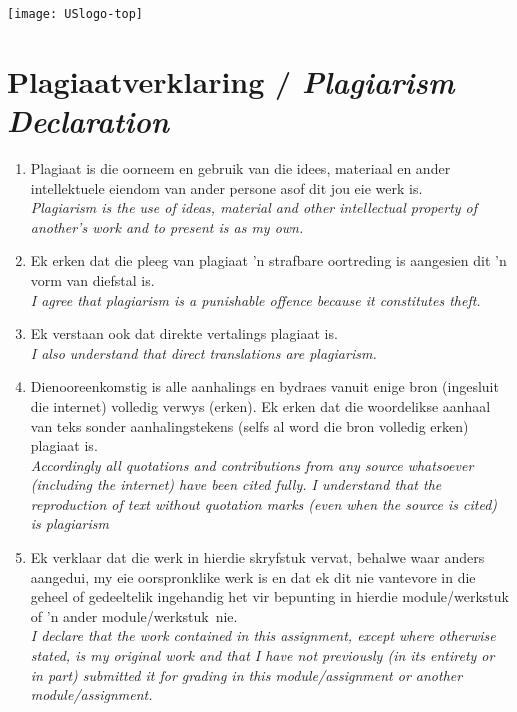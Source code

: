 \newpage
\thispagestyle{plain}
\makeatletter{}\makeatother

\centerline{\texttt{[image: USlogo-top]}}
\vspace*{-10pt}

\section*{\centering Plagiaatverklaring / \textit{Plagiarism Declaration}}

\vspace*{5pt}

\begin{enumerate}
    \item Plagiaat is die oorneem en gebruik van die idees, materiaal en ander intellektuele eiendom van ander persone asof dit jou eie werk is.\\
    \textit{Plagiarism is the use of ideas, material and other intellectual property of another's work
        and to present is as my own.}
    
    \item Ek erken dat die pleeg van plagiaat 'n strafbare oortreding is aangesien dit 'n vorm van diefstal is.\\
    \textit{I agree that plagiarism is a punishable offence because it constitutes theft.}
    
    \item Ek verstaan ook dat direkte vertalings plagiaat is. \\
    \textit{I also understand that direct translations are plagiarism.}
    
    \item Dienooreenkomstig is alle aanhalings en bydraes vanuit enige bron (ingesluit die internet) volledig verwys (erken). Ek erken dat die woordelikse aanhaal van teks sonder aanhalingstekens (selfs al word die bron volledig erken) plagiaat is. \\
    \textit{Accordingly all quotations and contributions from any source whatsoever (including the internet) have been cited fully. I understand that the reproduction of text without quotation marks (even when the source is cited) is plagiarism}
    
    \item Ek verklaar dat die werk in hierdie skryfstuk vervat, behalwe waar anders aangedui, my eie oorspronklike werk is en dat ek dit nie vantevore in die geheel of gedeeltelik ingehandig het vir bepunting in hierdie module/werkstuk of 'n ander module/werkstuk~nie. \\
    \textit{I declare that the work contained in this assignment, except where otherwise stated, is my original work and that I have not previously (in its entirety or in part) submitted it for grading in this module/assignment or another module/assignment.}
\end{enumerate}


